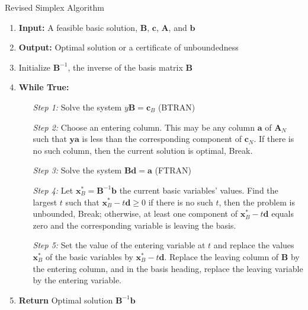 \begin{algorithm}
    \caption{Revised Simplex Algorithm \parencite{chvatal1983linear}}
    \begin{enumerate}
        \item \textbf{Input:} A feasible basic solution, \( \mathbf{B} \), \( \mathbf{c} \), \( \mathbf{A} \), and \( \mathbf{b} \)
        \item \textbf{Output:} Optimal solution or a certificate of unboundedness
        \item Initialize \( \mathbf{B}^{-1} \), the inverse of the basis matrix \( \mathbf{B} \)
        \item \textbf{While True:}
              \begin{itemize}
                  \setlength{\itemindent}{3em}
                  \item[\textit{Step 1:}] Solve the system \( y\mathbf{B} = \mathbf{c}_B \) (BTRAN)
                  \item[\textit{Step 2:}] Choose an entering column. This may be any column $\mathbf{a}$  of
                      \( \mathbf{A}_N \) such that \( \mathbf{y}\mathbf{a} \) is less than the corresponding component
                      of \( \mathbf{c}_N \). If there is no such column, then the current solution is optimal, Break.
                  \item[\textit{Step 3:}] Solve the system \( \mathbf{B}\mathbf{d} = \mathbf{a} \) (FTRAN)
                  \item[\textit{Step 4:}] Let \( \mathbf{x}_B^{\ast} = \mathbf{B}^{-1}\mathbf{b} \) the current basic variables' values.
                      Find the largest \( t \) such that \( \mathbf{x}_B^{\ast} - t\mathbf{d} \geq 0\)
                      if there is no such \( t \), then the problem is unbounded, Break; otherwise, at least
                      one component of  \( \mathbf{x}_B^{\ast} - t\mathbf{d} \) equals zero and the corresponding variable is leaving the basis.
                  \item[\textit{Step 5:}] Set the value of the entering variable at
                      \( t \) and replace the values \( \mathbf{x}_B^{\ast} \) of the basic variables by \( \mathbf{x}_B^{\ast} - t\mathbf{d} \).
                      Replace the leaving column of \( \mathbf{B} \) by the entering column, and in the basis heading,
                      replace the leaving variable by the entering variable.
              \end{itemize}

        \item \textbf{Return} Optimal solution \( \mathbf{B}^{-1}\mathbf{b} \)
    \end{enumerate}
    \label{algo:revised}
\end{algorithm}


